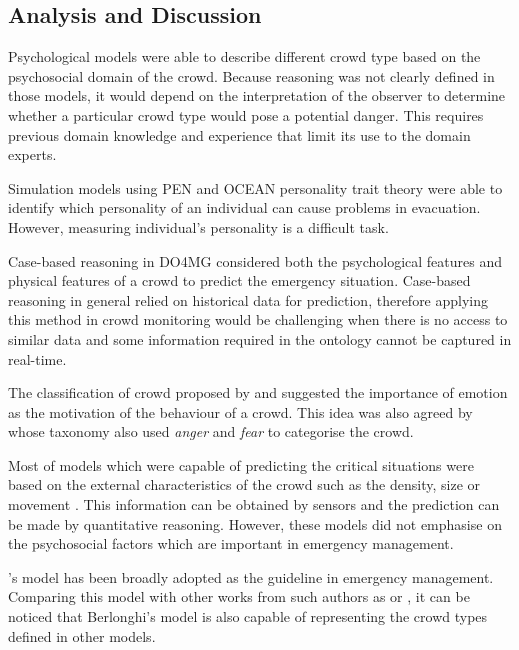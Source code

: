 \subsection{Analysis and Discussion}

Psychological models \citep{Blumer1951,Lofland1985,Momboisse1967} were able to describe different crowd type based on the psychosocial domain of the crowd. Because reasoning was not clearly defined in those models, it would depend on the interpretation of the observer to determine whether a particular crowd type would pose a potential danger. This requires previous domain knowledge and experience that limit its use to the domain experts.

Simulation models using PEN \citep{Guy2011} and OCEAN \citep{Durupinar2008} personality trait theory were able to identify which personality of an individual can cause problems in evacuation. However, measuring individual’s personality is a difficult task.

Case-based reasoning in DO4MG \citep{DelirHaghighi2013a} considered both the psychological features and physical features of a crowd to predict the emergency situation. Case-based reasoning in general relied on historical data for prediction, therefore applying this method in crowd monitoring would be challenging when there is no access to similar data and some information required in the ontology cannot be captured in real-time.

The classification of crowd proposed by \citet{Lofland1985} and \citet{Smelser1998} suggested the importance of emotion as the motivation of the behaviour of a crowd. This idea was also agreed by \citet{Brown1954} whose taxonomy also used \textit{anger} and \textit{fear} to categorise the crowd.

Most of models which were capable of predicting the critical situations were based on the external characteristics of the crowd such as the density, size or movement \citep{Helbing2007,Lee2005}. This information can be obtained by sensors and the prediction can be made by quantitative reasoning. However, these models did not emphasise on the psychosocial factors which are important in emergency management.

\citet{Berlonghi1995}’s model has been broadly adopted as the guideline in emergency management. Comparing this model with other works from such authors as \citet{Blumer1951} or \citet{Momboisse1967}, it can be noticed that Berlonghi's model is also capable of representing the crowd types defined in other models. 

